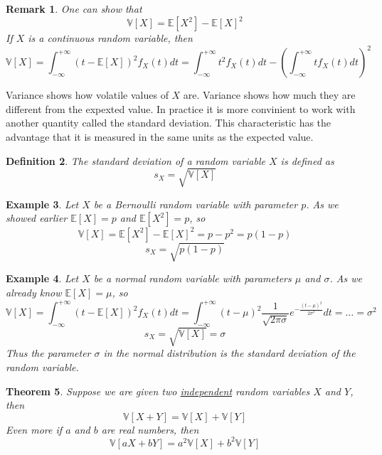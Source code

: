 \documentclass[12pt]{article}
\newtheorem{theorem}{Theorem}[subsection]
\newtheorem{remark}[theorem]{Remark}
\newtheorem{definition}[theorem]{Definition}
\newtheorem{example}[theorem]{Example}
\begin{document}
\begin{remark} One can show that
    $$
        \mathbb{V}[X]=\mathbb{E}[X^2]-{\mathbb{E}[X]}^2
    $$
    If $X$ is a continuous random variable, then
    $$
        \mathbb{V}[X]
        =\int_{-\infty}^{+\infty} {(t-\mathbb{E}[X])}^2 f_X(t)dt
        =\int_{-\infty}^{+\infty} t^2 f_X(t)dt-
        {\left( \int_{-\infty}^{+\infty} t f_X(t)dt\right)}^2
    $$
\end{remark}

Variance shows how volatile values of $X$ are. Variance shows how much they are
different from the expexted value. In practice it is more convinient to work
with another quantity called the standard deviation. This characteristic has the
advantage that it is measured in the same units as the expected value.

\begin{definition} The standard deviation of a random variable $X$ is defined as
    $$
        s_X=\sqrt{\mathbb{V}[X]}
    $$
\end{definition}

\begin{example} Let $X$ be a Bernoulli random variable with parameter $p$. As we
    showed earlier $\mathbb{E}[X]=p$ and $\mathbb{E}[X^2]=p$, so
    $$
        \mathbb{V}[X]=\mathbb{E}[X^2]-{\mathbb{E}[X]}^2=p-p^2=p(1-p)
    $$
    $$
        s_X=\sqrt{p(1-p)}
    $$
\end{example}

\begin{example} Let $X$ be a normal random variable with parameters $\mu$ and
    $\sigma$. As we already know $\mathbb{E}[X]=\mu$, so
    $$
        \mathbb{V}[X]
        =\int_{-\infty}^{+\infty}{(t-\mathbb{E}[X])}^2 f_X(t)dt
        =\int_{-\infty}^{+\infty}{(t-\mu)}^2
        \frac{1}{\sqrt{2\pi\sigma}}e^{-\frac{{(t-\mu)}^2}{2\sigma^2}}dt
        =\ldots
        =\sigma^2
    $$
    $$
        s_X=\sqrt{\mathbb{V}[X]}=\sigma
    $$
    Thus the parameter $\sigma$ in the normal distribution is the standard 
    deviation of the random variable.
\end{example}

\begin{theorem} Suppose we are given two \underline{independent} random
    variables $X$ and $Y$, then
    $$
        \mathbb{V}[X+Y]=\mathbb{V}[X]+\mathbb{V}[Y]
    $$
    Even more if $a$ and $b$ are real numbers, then
    $$
        \mathbb{V}[aX+bY]=a^2\mathbb{V}[X]+b^2\mathbb{V}[Y]
    $$
\end{theorem}
\end{document}

